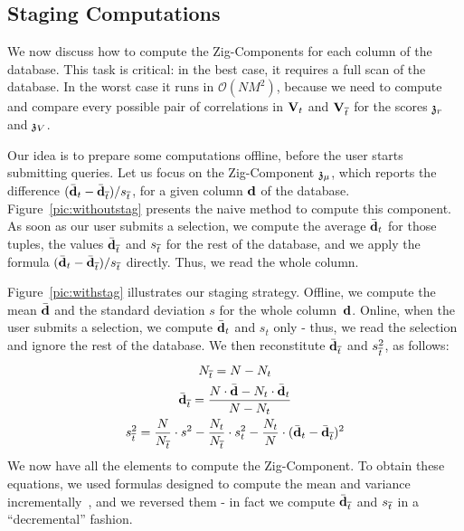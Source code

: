 \subsection{Staging Computations}
\label{sec:optimization}
We now discuss how to compute the Zig-Components for each column of the
database. This task is critical: in the best case, it requires a full scan of
the database. In the worst case it runs in $\mathcal{O}(NM^2)$, because
we need to compute and compare every possible pair of correlations in
$\mathbf{V}_t$ and $\mathbf{V}_{\overline{t}}$ for the scores $\mathfrak{z}_r$ and $\mathfrak{z}_V$.

Our idea is to prepare some computations offline, before the user starts
submitting queries.  Let us focus on the Zig-Component $\mathfrak{z}_\mu$, which
reports the difference $(\bar{\bf{d}}_t - \bar{\bf{d}}_{\overline{t}})/{s_{\overline{t}}}$,
for a given column $\bf{d}$ of the database.  Figure~\ref{pic:withoutstag}
presents the naive method to compute this component.  As soon as our user
submits a selection, we compute the average $\bar{\bf{d}}_t$ for those tuples,
the values $\bar{\bf{d}}_{\overline{t}}$ and $s_{\overline{t}}$ for the rest of the database,
and we apply the formula $(\bar{\bf{d}}_t - \bar{\bf{d}}_{\overline{t}})/{s_{\overline{t}}}$
directly. Thus, we read the whole column.

Figure~\ref{pic:withstag} illustrates our staging strategy. Offline, we compute
the mean $\bar{\bf{d}}$ and the standard deviation $s$ for the whole
column~$\bf{d}$. Online, when the user submits a selection, we compute
$\bar{\bf{d}}_t$ and $s_t$
only - thus, we read the selection and ignore the rest of the database. We then
reconstitute $\bar{\bf{d}}_{\overline{t}}$ and $s_{\overline{t}}^2$, as follows:
\begin{gather}
    N_{\overline{t}} = N - N_t\\
    \bar{\bf{d}}_{\overline{t}}= \frac{ N \cdot \bar{\bf{d}} -  N_t \cdot \bar{\bf{d}}_t } { N - N_t } \\
    s_{\overline{t}}^2 = \frac{N}{N_{\overline{t}}} \cdot s^2 - \frac{N_t}{N_{\overline{t}}} \cdot s_t^2 -
    \frac{N_t}{N} \cdot (\bar{\bf{d}}_t -  \bar{\bf{d}}_{\overline{t}})^2 
\end{gather}
We now have all the elements to compute the Zig-Component. To obtain these
equations, we used formulas designed to compute the mean and variance
incrementally~\cite{pebay2008formulas}, and we reversed them - in fact we
compute $\bar{\bf{d}}_{\overline{t}}$ and $s_{\overline{t}}$ in a ``decremental'' fashion.


